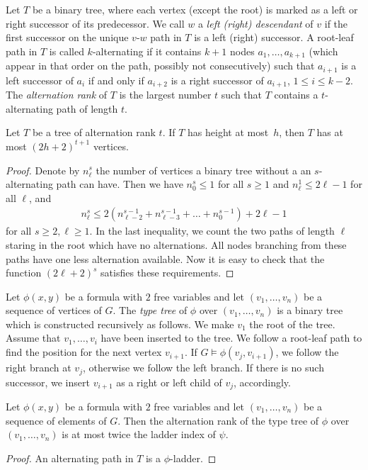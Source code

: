 Let $T$ be a binary tree, where each vertex (except the root) is 
marked as a left or right successor of its predecessor. We call $w$ 
a \emph{left (right) descendant} of $v$ if the first successor on the unique
$v$-$w$ path in $T$ is a left (right) successor. A root-leaf path in $T$ is called
$k$-alternating if it contains $k+1$ nodes $a_1,\ldots, a_{k+1}$ (which appear
in that order on the path, possibly not consecutively) such that $a_{i+1}$ is a left successor of $a_i$
if and only if $a_{i+2}$ is a right successor of $a_{i+1}$, $1\leq i\leq k-2$. 
The \emph{alternation rank} of $T$ is the largest number $t$ such that 
$T$ contains a $t$-alternating path of length $t$.

\begin{lemma}
Let $T$ be a tree of alternation rank $t$. If
$T$ has height at most~$h$, then $T$ has at most $(2h+2)^{t+1}$
vertices. 
\end{lemma}
\begin{proof}
Denote by $n_\ell^s$ the number of vertices a binary tree without a 
an $s$-alternating path can have. Then we have $n_0^s\leq 1$ for all $s\geq 1$
and $n_\ell^1\leq 2\ell-1$ for all $\ell$, and 
\begin{align*}
n_\ell^s\leq 2(n_{\ell-2}^{s-1}+n_{\ell-3}^{s-1}+\ldots + n_{0}^{s-1})+2\ell-1
\end{align*}
for all $s\geq 2,\ell\geq 1$. In the last inequality, we count the two paths of length
$\ell$ staring in the root which have no alternations. All nodes branching from 
these paths have one less alternation available. 
Now it is easy to check that the function $(2\ell+2)^s$ satisfies these requirements. 
\end{proof}

Let $\phi(x,y)$ be a formula with $2$ free variables and let $(v_1,\ldots, v_n)$
be a sequence of vertices of $G$. The \emph{type tree}
of $\phi$ over $(v_1,\ldots,v_n)$ is a binary tree which is constructed recursively as 
follows. We make $v_1$ the root of the tree. Assume that $v_1,\ldots, v_i$
have been inserted to the tree. We follow a root-leaf path to find the
position for the next vertex $v_{i+1}$. If $G\models\phi(v_j,v_{i+1})$, we
follow the right branch at $v_j$, otherwise we follow the left branch. If there is
no such successor, we insert $v_{i+1}$ as a right or left child of $v_j$, 
accordingly. 

\begin{lemma}
Let $\phi(x,y)$ be a formula with $2$ free variables and let
$(v_1,\ldots, v_n)$ be a sequence of elements of $G$. Then the 
alternation rank of the type tree of $\phi$ over $(v_1,\ldots, v_n)$
is at most twice the ladder index of $\psi$. 
\end{lemma}
\begin{proof}
An alternating path in $T$ is a $\phi$-ladder.
\end{proof}

